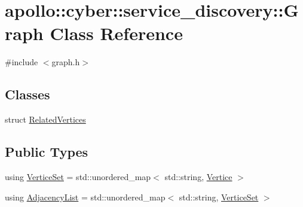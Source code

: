 \hypertarget{classapollo_1_1cyber_1_1service__discovery_1_1Graph}{\section{apollo\-:\-:cyber\-:\-:service\-\_\-discovery\-:\-:Graph Class Reference}
\label{classapollo_1_1cyber_1_1service__discovery_1_1Graph}
}


{\ttfamily \#include $<$graph.\-h$>$}

\subsection*{Classes}
\begin{DoxyCompactItemize}
\item 
struct \hyperlink{structapollo_1_1cyber_1_1service__discovery_1_1Graph_1_1RelatedVertices}{Related\-Vertices}
\end{DoxyCompactItemize}
\subsection*{Public Types}
\begin{DoxyCompactItemize}
\item 
using \hyperlink{classapollo_1_1cyber_1_1service__discovery_1_1Graph_ad9bc989f8c0b0495694872a2bb65f008}{Vertice\-Set} = std\-::unordered\-\_\-map$<$ std\-::string, \hyperlink{classapollo_1_1cyber_1_1service__discovery_1_1Vertice}{Vertice} $>$
\item 
using \hyperlink{classapollo_1_1cyber_1_1service__discovery_1_1Graph_a10a571d907b509c8d5026d5209e8edc9}{Adjacency\-List} = std\-::unordered\-\_\-map$<$ std\-::string, \hyperlink{classapollo_1_1cyber_1_1service__discovery_1_1Graph_ad9bc989f8c0b0495694872a2bb65f008}{Vertice\-Set} $>$
\end{DoxyCompactItemize}
